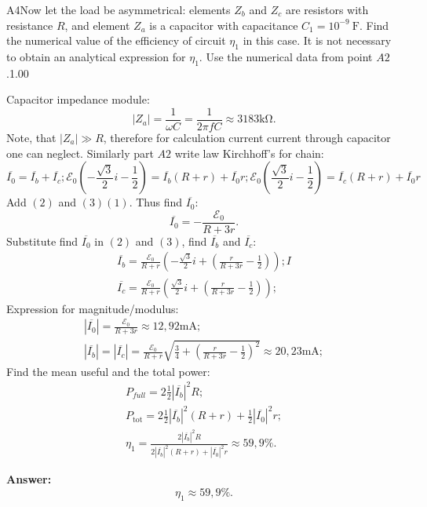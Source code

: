 \documentclass[11pt,a4paper]{article}
\begin{document}
\begin{solcard}{A4}{Now let the load be asymmetrical: elements $Z_b$ and $Z_c$ are resistors with resistance $R$, and element $Z_a$ is a capacitor with capacitance $C_1 = 10^{-9}~\text{F}$. Find the numerical value of the efficiency of circuit $\eta_1$ in this case. It is not necessary to obtain an analytical expression for $\eta_1$. Use the numerical data from point $A2$.}{1.00}

Capacitor impedance module: $$ |Z_a| = \frac{1}{\omega C} =  \frac{1}{2\pi f C} \approx 3183\mathrm{k\Omega}. $$ Note, that $|Z_a|\gg R$, therefore for calculation current current through capacitor one can neglect. Similarly part $A2$ write law Kirchhoff's for chain: \begin{equation} \overline{I_0} = \overline{I_b} + \overline{I_c};  \mathcal{E}_{0}\left(-\frac{\sqrt{3}}{2}i - \frac{1}{2}\right) = \overline{I_b}(R + r) + \overline{I_0}r;  \mathcal{E}_{0}\left(\frac{\sqrt{3}}{2}i - \frac{1}{2}\right) = \overline{I_c}(R + r) + \overline{I_0}r\end{equation} Add $(2)$ and $(3)(1)$. Thus find $\overline{I_0}$: $$ \overline{I_0} = -\frac{\mathcal{E_0}}{R + 3r}. $$ Substitute find $\overline{I_0}$ in $(2)$ and $(3)$, find $\overline{I_b}$ and $\overline{I_c}$: $$\begin{aligned} \overline{I_b} = \frac{\mathcal{E_0}}{R + r}\left(-\frac{\sqrt{3}}{2}i + \left(\frac{r}{R + 3r} - \frac{1}{2} \right)\right); I \\
 \overline{I_c} = \frac{\mathcal{E_0}}{R + r}\left(\frac{\sqrt{3}}{2}i + \left(\frac{r}{R + 3r} - \frac{1}{2} \right)\right); \end{aligned}$$ Expression for magnitude/modulus: $$\begin{aligned} |\overline{I_0}| = \frac{\mathcal{E_0}}{R + 3r} \approx 12{,}92\mathrm{mA}; \\
 |\overline{I_b}|= |\overline{I_c}| = \frac{\mathcal{E_0}}{R + r}\sqrt{\frac{3}{4} + \left(\frac{r}{R + 3r} - \frac{1}{2}\right)^2} \approx 20{,}23\mathrm{mA}; \end{aligned}$$ Find the mean useful and the total power: $$\begin{aligned} P_{full} = 2\frac{1}{2}|\overline{I_b}|^2R; \\
 P_\text{tot} = 2\frac{1}{2}|\overline{I_b}|^2(R+r) + \frac{1}{2}|\overline{I_0}|^2r; \\
 \eta_1 = \frac{2|\overline{I_b}|^2R}{2|\overline{I_b}|^2(R+r) +|\overline{I_0}|^2r } \approx 59{,}9\%. \end{aligned}$$

\par\smallskip\noindent\textbf{Answer:} $$ \eta_1 \approx 59{,}9\%. $$
\end{solcard}
\end{document}
